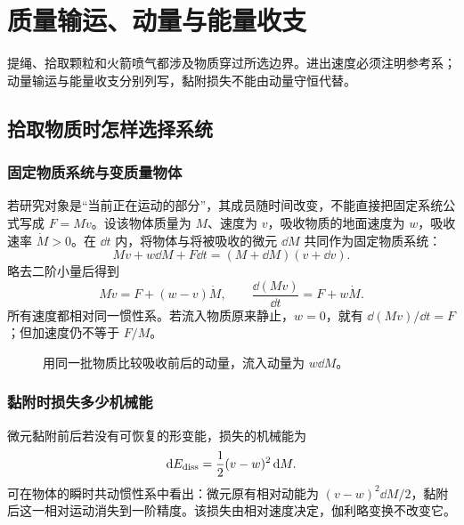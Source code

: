 \section{质量输运、动量与能量收支}

提绳、拾取颗粒和火箭喷气都涉及物质穿过所选边界。进出速度必须注明参考系；动量输运与能量收支分别列写，黏附损失不能由动量守恒代替。



\subsection{拾取物质时怎样选择系统}
\subsubsection{固定物质系统与变质量物体}
若研究对象是“当前正在运动的部分”，其成员随时间改变，不能直接把固定系统公式写成 $F=M\dot v$。设该物体质量为 $M$、速度为 $v$，吸收物质的地面速度为 $w$，吸收速率 $\dot M>0$。在 $\dd t$ 内，将物体与将被吸收的微元 $\dd M$ 共同作为固定物质系统：
\[
Mv+w\dd M+F\dd t=(M+\dd M)(v+\dd v).
\]
略去二阶小量后得到
\begin{equation}
M\dot v=F+(w-v)\dot M,
\qquad \frac{\dd(Mv)}{\dd t}=F+w\dot M.
\label{sup3:eq:d3-accretion}
\end{equation}
所有速度都相对同一惯性系。若流入物质原来静止，$w=0$，就有 $\dd(Mv)/\dd t=F$；但加速度仍不等于 $F/M$。

\begin{figure}[H]\centering
{}
\caption{用同一批物质比较吸收前后的动量，流入动量为 $w\dd M$。}\label{sup3:fig:d3-flux}
\end{figure}

\subsubsection{黏附时损失多少机械能}
微元黏附前后若没有可恢复的形变能，损失的机械能为
\begin{equation}
\mathop{}\!\mathrm d E_{\rm diss}=\frac12(v-w)^2\mathop{}\!\mathrm d M.
\label{sup3:eq:d3-diss}
\end{equation}
可在物体的瞬时共动惯性系中看出：微元原有相对动能为 $(v-w)^2\dd M/2$，黏附后这一相对运动消失到一阶精度。该损失由相对速度决定，伽利略变换不改变它。

